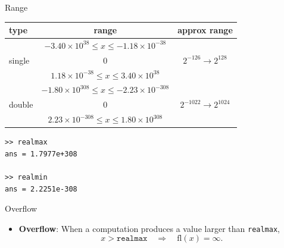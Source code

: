 \documentclass[10pt]{beamer}
\begin{document}
\begin{frame}[fragile]{Range}
\begin{center}
    
\begin{tabular}{l|c|c}
type    & range                                                     & approx
range\\\hline\hline
        & $-3.40\times 10^{38} \leq x \leq -1.18 \times 10^{-38}$   & \\
single  & 0                                                         & $2^{-126}\rightarrow 2^{128}$\\
        & $1.18 \times 10^{-38} \leq x \leq 3.40 \times 10^{38}$    & \\\hline
        & $-1.80\times 10^{308} \leq x \leq -2.23 \times 10^{-308}$ & \\
double  & 0                                                         & $2^{-1022}\rightarrow 2^{1024}$\\
        & $2.23 \times 10^{-308} \leq x \leq 1.80 \times 10^{308} $ & \\
\end{tabular}
\end{center}
\begin{lstlisting}
>> realmax
ans = 1.7977e+308

>> realmin
ans = 2.2251e-308
\end{lstlisting}
\end{frame}
\begin{frame}{Overflow}

\begin{center}
\end{center}

\begin{itemize}

    \item \textbf{Overflow}:  
    When a computation produces a value larger than \texttt{realmax},  
    \[
    x > \texttt{realmax} \quad \Longrightarrow \quad \mathrm{fl}(x) = \infty.
    \]
\end{itemize}

\end{frame}
\end{document}
